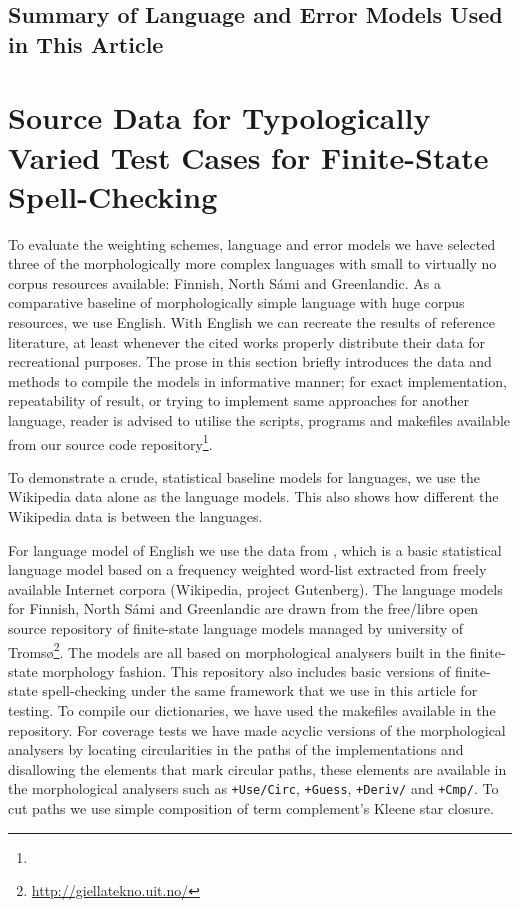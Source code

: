 \documentclass[a4paper,12pt]{article}
\begin{document}
\subsection{Summary of Language and Error Models Used in This Article}



\section{Source Data for Typologically Varied Test Cases for Finite-State
Spell-Checking}
\label{sec:material}

To evaluate the weighting schemes, language and error models we have selected
three of the morphologically more complex languages with small to virtually no
corpus resources available: Finnish, North Sámi and Greenlandic. As a
comparative baseline of morphologically simple language with huge corpus
resources, we use English.
With English we can recreate the results of
reference literature, at least whenever the cited works properly distribute
their data for recreational purposes. The prose in this section briefly
introduces the data and methods to compile the models in informative manner;
for exact implementation, repeatability of result, or trying to implement same
approaches for another language, reader is advised to utilise the scripts,
programs and makefiles available from our source code
repository\footnote{}.

To demonstrate a crude, statistical baseline models for languages, we use
the Wikipedia data alone as the language models. This also shows how different
the Wikipedia data is between the languages.

For language model of English we use the data from
\cite{norvig/2010,pirinen2012effects}, which is a basic statistical language
model based on a frequency weighted word-list extracted from freely available
Internet corpora (Wikipedia, project Gutenberg).  The language models for
Finnish, North Sámi and Greenlandic are drawn from the free/libre open source
repository of finite-state language models managed by university of
Tromsø\footnote{\url{http://giellatekno.uit.no/}}. The
models are all based on morphological analysers built in the finite-state
morphology \cite[]{beesley2003finite} fashion. This repository also includes
basic versions of finite-state spell-checking under the same framework that we
use in this article for testing. To compile our dictionaries, we have used the
makefiles available in the repository.  For coverage tests we have made acyclic
versions of the morphological analysers by locating circularities in the paths
of the implementations and disallowing the elements that mark circular paths,
these elements are available in the morphological analysers such as
\texttt{+Use/Circ}, \texttt{+Guess}, \texttt{+Deriv/} and \texttt{+Cmp/}. To
cut paths we use simple composition of term complement's Kleene star closure.
\end{document}
